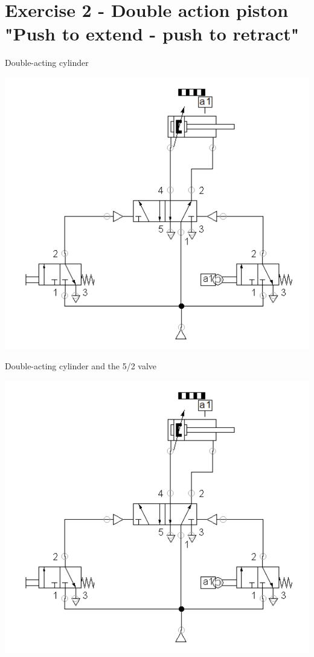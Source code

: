 \documentclass[presentation,aspectratio=1610]{beamer}
\begin{document}
\section{Exercise 2 - Double action piston "Push to extend - push to retract"}
\label{sec:org1e2592c}
\begin{frame}[label={sec:org5753272}]{Double-acting cylinder}
\begin{center}
\includegraphics[width=0.7\linewidth]{../../figures/valve-52.png}
\end{center}
\end{frame}
\begin{frame}[label={sec:org9c0604a}]{Double-acting cylinder and the 5/2 valve}
\begin{center}
\includegraphics[width=0.7\linewidth]{../../figures/valve-52.png}
\end{center}
\end{frame}
\end{document}
